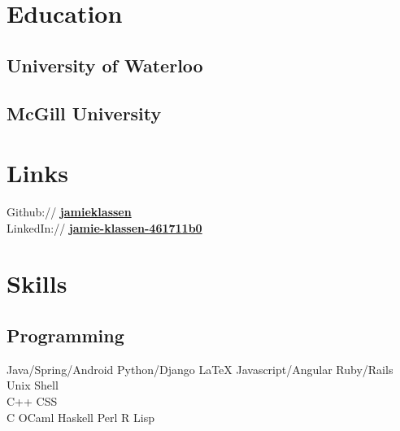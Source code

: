\documentclass[letterpaper]{deedy-resume}
\begin{document}
\lastupdated


\begin{minipage}[t]{0.33\textwidth}

\section{Education} 
\subsection{University of Waterloo}


\sectionspace

\subsection{McGill University}


\sectionspace

\section{Links} 

Github:// \href{https://github.com/jamieklassen}{\bf jamieklassen} \\
LinkedIn:// \href{https://ca.linkedin.com/in/jamie-klassen-461711b0}
{\bf jamie-klassen-461711b0} \\

\sectionspace

\section{Skills}

\subsection{Programming}

Java/Spring/Android \textbullet{}
Python/Django \textbullet{} \LaTeX \textbullet{}
Javascript/Angular \textbullet{} Ruby/Rails \textbullet{} Unix Shell \\
C++ \textbullet{} CSS \\
C \textbullet{} OCaml \textbullet{} Haskell \textbullet{} Perl \textbullet{} R
\textbullet{} Lisp


\end{minipage}
\end{document}
